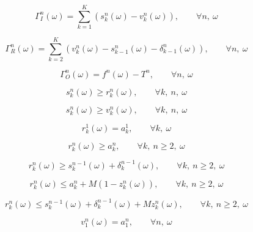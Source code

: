 \documentclass[UTF8,11pt]{ctexart}
\begin{document}
\begin{equation}
\Gamma_I^n(\omega) =
\sum_{k=1}^{K} \left( s_k^n(\omega) - v_k^n(\omega) \right),
\qquad \forall n,\ \omega
\tag{10c}
\end{equation}

\begin{equation}
\Gamma_R^n(\omega) =
\sum_{k=2}^{K} \left( v_k^n(\omega) - s_{k-1}^n(\omega) - \delta_{k-1}^n(\omega) \right),
\qquad \forall n,\ \omega
\tag{10d}
\end{equation}

\begin{equation}
\Gamma_O^n(\omega) = f^n(\omega) - T^n,
\qquad \forall n,\ \omega
\tag{10e}
\end{equation}

\begin{equation}
s_k^n(\omega) \ge r_k^n(\omega),
\qquad \forall k,\ n,\ \omega
\tag{11}
\end{equation}

\begin{equation}
s_k^n(\omega) \ge v_k^n(\omega),
\qquad \forall k,\ n,\ \omega
\tag{12}
\end{equation}

\begin{equation}
r_k^1(\omega) = a_k^1,
\qquad \forall k,\ \omega
\tag{13a}
\end{equation}

\begin{equation}
r_k^n(\omega) \ge a_k^n,
\qquad \forall k,\ n \ge 2,\ \omega
\tag{13b}
\end{equation}

\begin{equation}
r_k^n(\omega) \ge s_k^{n-1}(\omega) + \delta_k^{n-1}(\omega),
\qquad \forall k,\ n \ge 2,\ \omega
\tag{14}
\end{equation}

\begin{equation}
r_k^n(\omega) \le a_k^n + M(1-z_k^n(\omega)),
\qquad \forall k,\ n \ge 2,\ \omega
\tag{15}
\end{equation}

\begin{equation}
r_k^n(\omega) \le s_k^{n-1}(\omega) + \delta_k^{n-1}(\omega) + M z_k^n(\omega),
\qquad \forall k,\ n \ge 2,\ \omega
\tag{16}
\end{equation}

\begin{equation}
v_1^n(\omega) = a_1^n,
\qquad \forall n,\ \omega
\tag{17}
\end{equation}
\end{document}
